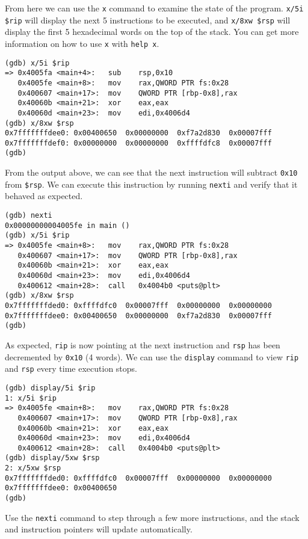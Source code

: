 From here we can use the \texttt{x} command to examine the state of the program.
\texttt{x/5i \$rip} will display the next 5 instructions to be executed, and
\texttt{x/8xw \$rsp} will display the first 5 hexadecimal words on the top of the
stack. You can get more information on how to use \texttt{x} with \texttt{help
x}.

\begin{lstlisting}
(gdb) x/5i $rip
=> 0x4005fa <main+4>:	sub    rsp,0x10
   0x4005fe <main+8>:	mov    rax,QWORD PTR fs:0x28
   0x400607 <main+17>:	mov    QWORD PTR [rbp-0x8],rax
   0x40060b <main+21>:	xor    eax,eax
   0x40060d <main+23>:	mov    edi,0x4006d4
(gdb) x/8xw $rsp
0x7fffffffdee0:	0x00400650	0x00000000	0xf7a2d830	0x00007fff
0x7fffffffdef0:	0x00000000	0x00000000	0xffffdfc8	0x00007fff
(gdb) 
\end{lstlisting}

From the output above, we can see that the next instruction will subtract
\texttt{0x10} from \texttt{\$rsp}. We can execute this instruction by running
\texttt{nexti} and verify that it behaved as expected.

\begin{lstlisting}
(gdb) nexti
0x00000000004005fe in main ()
(gdb) x/5i $rip
=> 0x4005fe <main+8>:	mov    rax,QWORD PTR fs:0x28
   0x400607 <main+17>:	mov    QWORD PTR [rbp-0x8],rax
   0x40060b <main+21>:	xor    eax,eax
   0x40060d <main+23>:	mov    edi,0x4006d4
   0x400612 <main+28>:	call   0x4004b0 <puts@plt>
(gdb) x/8xw $rsp
0x7fffffffded0:	0xffffdfc0	0x00007fff	0x00000000	0x00000000
0x7fffffffdee0:	0x00400650	0x00000000	0xf7a2d830	0x00007fff
(gdb) 
\end{lstlisting}

As expected, \texttt{rip} is now pointing at the next instruction and
\texttt{rsp} has been decremented by \texttt{0x10} (4 words). We can use the
\texttt{display} command to view \texttt{rip} and \texttt{rsp} every time
execution stops.

\begin{lstlisting}
(gdb) display/5i $rip
1: x/5i $rip
=> 0x4005fe <main+8>:	mov    rax,QWORD PTR fs:0x28
   0x400607 <main+17>:	mov    QWORD PTR [rbp-0x8],rax
   0x40060b <main+21>:	xor    eax,eax
   0x40060d <main+23>:	mov    edi,0x4006d4
   0x400612 <main+28>:	call   0x4004b0 <puts@plt>
(gdb) display/5xw $rsp
2: x/5xw $rsp
0x7fffffffded0:	0xffffdfc0	0x00007fff	0x00000000	0x00000000
0x7fffffffdee0:	0x00400650
(gdb) 
\end{lstlisting}

Use the \texttt{nexti} command to step through a few more instructions, and
the stack and instruction pointers will update automatically.


